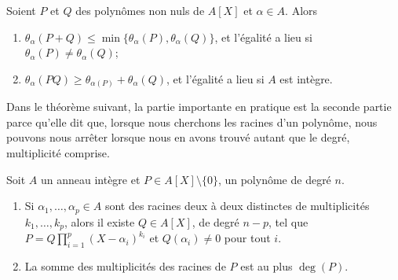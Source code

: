 \begin{lemma}       \label{LemIeLhpc}
    Soient \( P\) et \( Q\) des polynômes non nuls de \( A[X]\) et \( \alpha\in A\). Alors
    \begin{enumerate}
        \item
            \( \theta_{\alpha}(P+Q)\leq\min\{
            \theta_{\alpha}(P),\theta_{\alpha}(Q) \}\), et l'égalité a
            lieu si \( \theta_{\alpha}(P)\neq \theta_{\alpha}(Q)\);
        \item     \label{ItemIeLhpciv}
            \( \theta_{\alpha}(PQ)\geq
            \theta_{\alpha(P)}+\theta_{\alpha}(Q)\), et l'égalité a
            lieu si \( A \) est intègre.
    \end{enumerate}
\end{lemma}

Dans le théorème suivant, la partie importante en pratique est la seconde partie parce qu'elle dit que, lorsque nous cherchons les racines d'un polynôme, nous pouvons nous arrêter lorsque nous en avons trouvé autant que le degré, multiplicité comprise.
\begin{theorem} \label{ThoSVZooMpNANi}
    Soit \( A\) un anneau intègre
  et \( P\in A[X]\setminus\{ 0 \}\), un polynôme de degré \( n\). 

  \begin{enumerate}
      \item
  Si \( \alpha_1,\ldots, \alpha_p\in A\) sont des racines deux à deux
  distinctes de multiplicités \( k_1,\ldots, k_p\), alors il existe \(
  Q\in A[X]\), de degré \( n-p\), tel que \(
  P=Q\prod_{i=1}^p(X-\alpha_i)^{k_i}\) et \( Q(\alpha_i)\neq 0\) pour
  tout $i$.
  \item     \label{ITEMooWGOBooGApPOo}
    La somme des multiplicités des racines de \( P\) est au plus \( \deg(P)\).
  \end{enumerate}
\end{theorem}

